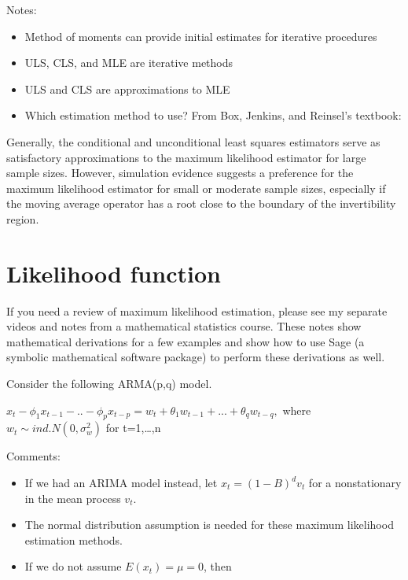 \documentclass[
]{book}
\providecommand{\tightlist}{%
  \setlength{\itemsep}{0pt}\setlength{\parskip}{0pt}}
\theoremstyle{definition}
\theoremstyle{definition}
\theoremstyle{definition}
\theoremstyle{definition}
\theoremstyle{remark}
\begin{document}
Notes:

\begin{itemize}
\tightlist
\item
  Method of moments can provide initial estimates for iterative procedures
\item
  ULS, CLS, and MLE are iterative methods
\item
  ULS and CLS are approximations to MLE
\item
  Which estimation method to use? From Box, Jenkins, and Reinsel's textbook:
\end{itemize}

Generally, the conditional and unconditional least squares estimators serve as satisfactory approximations to the maximum likelihood estimator for large sample sizes. However, simulation evidence suggests a preference for the maximum likelihood estimator for small or moderate sample sizes, especially if the moving average operator has a root close to the boundary of the invertibility region.

\hypertarget{likelihood-function}{%
\section{Likelihood function}\label{likelihood-function}}

If you need a review of maximum likelihood estimation, please see my separate videos and notes from a mathematical statistics course. These notes show mathematical derivations for a few examples and show how to use Sage (a symbolic mathematical software package) to perform these derivations as well.

Consider the following ARMA(p,q) model.

\(x_t-\phi_1x_{t-1}-..-\phi_px_{t-p}=w_t+\theta_1w_{t-1}+...+\theta_qw_{t-q},\) where \(w_t \sim ind. N(0, \sigma_w^2)\) for t=1,\ldots,n

Comments:

\begin{itemize}
\tightlist
\item
  If we had an ARIMA model instead, let \(x_t = (1-B)^dv_t\) for a nonstationary in the mean process \(v_t\).
\item
  The normal distribution assumption is needed for these maximum likelihood estimation methods.\\
\item
  If we do not assume \(E(x_t) = \mu = 0\), then
\end{itemize}
\end{document}
